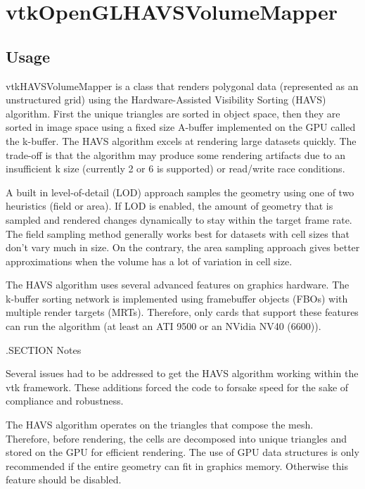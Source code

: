 \section{vtkOpenGLHAVSVolumeMapper}

\subsection{Usage}


 vtkHAVSVolumeMapper is a class that renders polygonal data
 (represented as an unstructured grid) using the Hardware-Assisted
 Visibility Sorting (HAVS) algorithm.  First the unique triangles are sorted
 in object space, then they are sorted in image space using a fixed size
 A-buffer implemented on the GPU called the k-buffer.  The HAVS algorithm
 excels at rendering large datasets quickly.  The trade-off is that the
 algorithm may produce some rendering artifacts due to an insufficient k
 size (currently 2 or 6 is supported) or read/write race conditions.
 
 A built in level-of-detail (LOD) approach samples the geometry using one of
 two heuristics (field or area).  If LOD is enabled, the amount of geometry
 that is sampled and rendered changes dynamically to stay within the target
 frame rate.  The field sampling method generally works best for datasets
 with cell sizes that don't vary much in size.  On the contrary, the area
 sampling approach gives better approximations when the volume has a lot of
 variation in cell size.

 The HAVS algorithm uses several advanced features on graphics hardware.
 The k-buffer sorting network is implemented using framebuffer objects
 (FBOs) with multiple render targets (MRTs).  Therefore, only cards that
 support these features can run the algorithm (at least an ATI 9500 or an
 NVidia NV40 (6600)).

 .SECTION Notes

 Several issues had to be addressed to get the HAVS algorithm working within
 the vtk framework.  These additions forced the code to forsake speed for
 the sake of compliance and robustness.

 The HAVS algorithm operates on the triangles that compose the mesh.
 Therefore, before rendering, the cells are decomposed into unique triangles
 and stored on the GPU for efficient rendering.  The use of GPU data
 structures is only recommended if the entire geometry can fit in graphics
 memory.  Otherwise this feature should be disabled. 

